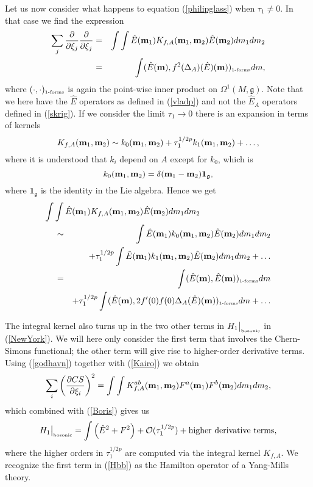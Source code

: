 \documentclass[12pt]{article}
\newcommand{\nn}{\nonumber}
\def\OO{\Omega}
\def\co{{\cal O}}
\newcommand{\pa}{\partial}
\begin{document}
Let us now consider what happens to equation (\ref{philipglass}) when $\tau_1\not=0$. In that case we find the expression
\begin{eqnarray*}
\sum_j \frac{\partial}{\partial \xi_j} \frac{\partial}{\partial \xi_j} 
 & = &\int \int  \hat{E}({\bf m}_1) K_{f,A}({\bf m}_1,{\bf m}_2) \hat{E}({\bf m}_2)dm_1 dm_2 \\
 &=& \int (\hat{E}({\bf m}), f^2 (\Delta_A)(\hat{E})({\bf m}))_{\mbox{\tiny 1-forms}} d m,
\end{eqnarray*}
where $(\cdot , \cdot )_{\mbox{\tiny 1-forms}}$ is again the point-wise inner product on $\OO^1(M,\mathfrak{g})$.
Note that we here have the $\hat{E}$ operators as defined in (\ref{vladp}) and not the $\hat{E}_A$ operators defined in (\ref{skrig}). If we consider the limit $\tau_1\to 0$ there is an expansion in terms of kernels
$$  K_{f,A}({\bf m}_1,{\bf m}_2) \sim k_0({\bf m}_1,{\bf m}_2)+\tau_1^{{1/2p}} k_1({\bf m}_1,{\bf m}_2)+\ldots ,$$
where it is understood that $k_i$ depend on $A$ except for $k_0$, which is 
$$
k_0({\bf m}_1,{\bf m}_2)=\delta({\bf m}_1 - {\bf m}_2)\mathbf{1}_{\mathfrak{g}},
$$ 
where $\mathbf{1}_\mathfrak{g}$
is the identity in the Lie algebra.
Hence we get 
\begin{eqnarray}
\int \int  \hat{E}({\bf m}_1) K_{f,A}({\bf m}_1,{\bf m}_2) \hat{E}({\bf m}_2)dm_1 dm_2 
\hspace{-6cm}&&\nn\\
&\sim& \int \hat{E} ({\bf m}_1) k_0({\bf m}_1,{\bf m}_2)\hat{E} ({\bf m}_2)dm_1dm_2
\nn\\&&
+\tau_1^{{1/2p}} \int \hat{E} ({\bf m}_1) k_1 ({\bf m}_1,{\bf m}_2)\hat{E} ({\bf m}_2) dm_1 dm_2+\ldots   \nn \\
&=&         \int (\hat{E} ({\bf m}) ,\hat{E} ({\bf m}))_{\mbox{\tiny 1-forms}}dm \nn
\\
&& +\tau_1^{{1/2p}} \int (\hat{E} ({\bf m}), 2f'(0)f(0)\Delta_A( \hat{E}) ({\bf m}))_{\mbox{\tiny 1-forms}} dm +\ldots    
\label{Boris}
\end{eqnarray} 







The integral kernel also turns up in the two other terms in $H_1\big\vert_{\mbox{\tiny bosonic}}$ in (\ref{NewYork}). We will here only consider the first term that involves the Chern-Simons functional; the other term will give rise to higher-order derivative terms. 
Using (\ref{godhavn}) together with (\ref{Kairo}) we obtain
\begin{eqnarray*}
\sum_i \left(\frac{\pa CS}{\pa \xi_i} \right)^2  =  \int \int  K^{ab}_{f,A}({\bf m}_1,{\bf m}_2) F^a({\bf m}_1) F^b({\bf m}_2)  dm_1 dm_2,
\end{eqnarray*}
which combined with (\ref{Boris}) gives us
\begin{equation}
H_1 \big\vert_{\mbox{\tiny bosonic}} = \int \left(\hat{E}^2   + F^2 \right) + \co(\tau_1^{{1/2p}}) + \mbox{higher derivative terms} ,
\label{Hbb}
\end{equation}
where the higher orders in $\tau_1^{{1/2p}}$ are computed via the integral kernel $K_{f,A}$. We recognize the first term in (\ref{Hbb}) as the Hamilton operator of a Yang-Mills theory.
\end{document}
